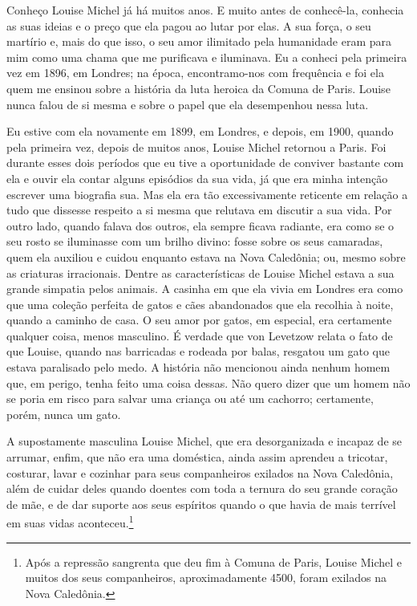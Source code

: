 Conheço Louise Michel já há muitos anos. E muito antes de conhecê-la,
conhecia as suas ideias e o preço que ela pagou ao lutar por elas. A sua
força, o seu martírio e, mais do que isso, o seu amor ilimitado pela
humanidade eram para mim como uma chama que me purificava e iluminava.
Eu a conheci pela primeira vez em 1896, em Londres; na época,
encontramo-nos com frequência e foi ela quem me ensinou sobre a história
da luta heroica da Comuna de Paris. Louise nunca falou de si mesma e
sobre o papel que ela desempenhou nessa luta.

Eu estive com ela novamente em 1899, em Londres, e depois, em 1900,
quando pela primeira vez, depois de muitos anos, Louise Michel retornou
a Paris. Foi durante esses dois períodos que eu tive a oportunidade de
conviver bastante com ela e ouvir ela contar alguns episódios da sua
vida, já que era minha intenção escrever uma biografia sua. Mas ela era
tão excessivamente reticente em relação a tudo que dissesse respeito a
si mesma que relutava em discutir a sua vida. Por outro lado, quando
falava dos outros, ela sempre ficava radiante, era como se o seu rosto
se iluminasse com um brilho divino: fosse sobre os seus camaradas, quem
ela auxiliou e cuidou enquanto estava na Nova Caledônia; ou, mesmo sobre
as criaturas irracionais. Dentre as características de Louise Michel
estava a sua grande simpatia pelos animais. A casinha em que ela vivia
em Londres era como que uma coleção perfeita de gatos e cães abandonados
que ela recolhia à noite, quando a caminho de casa. O seu amor por
gatos, em especial, era certamente qualquer coisa, menos masculino. É
verdade que von Levetzow relata o fato de que Louise, quando nas
barricadas e rodeada por balas, resgatou um gato que estava paralisado
pelo medo. A história não mencionou ainda nenhum homem que, em perigo,
tenha feito uma coisa dessas. Não quero dizer que um homem não se poria
em risco para salvar uma criança ou até um cachorro; certamente, porém,
nunca um gato.

A supostamente masculina Louise Michel, que era desorganizada e incapaz
de se arrumar, enfim, que não era uma doméstica, ainda assim aprendeu a
tricotar, costurar, lavar e cozinhar para seus companheiros exilados na
Nova Caledônia, além de cuidar deles quando doentes com toda a ternura
do seu grande coração de mãe, e de dar suporte aos seus espíritos quando
o que havia de mais terrível em suas vidas aconteceu.\footnote{Após a
  repressão sangrenta que deu fim à Comuna de Paris, Louise Michel e
  muitos dos seus companheiros, aproximadamente 4500, foram exilados na
  Nova Caledônia.}

